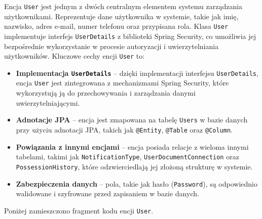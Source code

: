 Encja \texttt{User} jest jednym z dwóch centralnym elementem systemu zarządzania użytkownikami. Reprezentuje dane użytkownika w systemie, takie jak imię, nazwisko, adres e-mail, numer telefonu oraz przypisana rola. Klasa \texttt{User} implementuje interfejs \texttt{UserDetails} z biblioteki Spring Security, co umożliwia jej bezpośrednie wykorzystanie w procesie autoryzacji i uwierzytelniania użytkowników. Kluczowe cechy encji \texttt{User} to:
\begin{itemize}
    \item \textbf{Implementacja \texttt{UserDetails}} -- dzięki implementacji interfejsu \texttt{UserDetails}, encja \texttt{User} jest zintegrowana z mechanizmami Spring Security, które wykorzystują ją do przechowywania i zarządzania danymi uwierzytelniającymi.
    \item \textbf{Adnotacje JPA} -- encja jest zmapowana na tabelę \texttt{Users} w bazie danych przy użyciu adnotacji JPA, takich jak \texttt{@Entity}, \texttt{@Table} oraz \texttt{@Column}.
    \item \textbf{Powiązania z innymi encjami} -- encja posiada relacje z wieloma innymi tabelami, takimi jak \texttt{NotificationType}, \texttt{UserDocumentConnection} oraz \texttt{PossessionHistory}, które odzwierciedlają jej złożoną strukturę w systemie.
    \item \textbf{Zabezpieczenia danych} -- pola, takie jak hasło (\texttt{Password}), są odpowiednio walidowane i szyfrowane przed zapisaniem w bazie danych.
\end{itemize}
Poniżej zamieszczono fragment kodu encji \texttt{User}.

